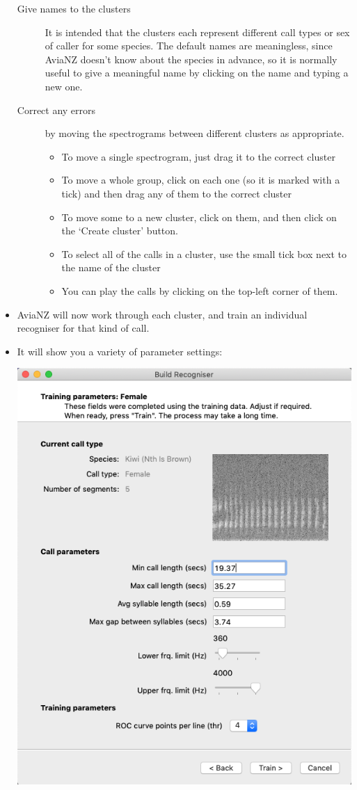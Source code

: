 \documentclass{article}
\begin{document}
\begin{itemize}
\begin{description}
\item[Give names to the clusters] It is intended that the clusters each represent different call types or sex of caller for some species. The default names are meaningless, since AviaNZ doesn't know about the species in advance, so it is normally useful to give a meaningful name by clicking on the name and typing a new one. 

\item[Correct any errors] by moving the spectrograms between different clusters as appropriate. 
\begin{itemize}
\item To move a single spectrogram, just drag it to the correct cluster
\item To move a whole group, click on each one (so it is marked with a tick) and then drag any of them to the correct cluster
\item To move some to a new cluster, click on them, and then click on the `Create cluster' button. 
\item To select all of the calls in a cluster, use the small tick box next to the name of the cluster
\item You can play the calls by clicking on the top-left corner of them.
\end{itemize}
\end{description}



    
\item AviaNZ will now work through each cluster, and train an individual recogniser for that kind of call. 
\item It will show you a variety of parameter settings:

\begin{center}
    \includegraphics[width=.4\textwidth]{Figs/Wizard_params}
\end{center}


\end{itemize}
\end{document}
